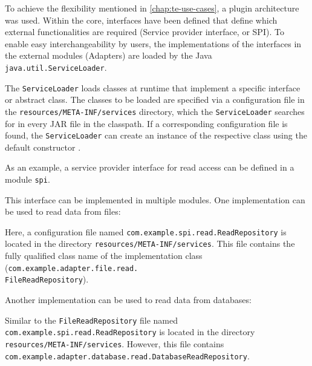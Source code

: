 To achieve the flexibility mentioned in \autoref{chap:te-use-cases}, a plugin architecture was used.
Within the core, interfaces have been defined that define which external functionalities are required (Service provider interface, or SPI).
To enable easy interchangeability by users, the implementations of the interfaces in the external modules (Adapters) are loaded by the Java \texttt{java.util.ServiceLoader}.

The \texttt{ServiceLoader} loads classes at runtime that implement a specific interface or abstract class.
The classes to be loaded are specified via a configuration file in the \texttt{resources/META-INF/services} directory, which the \texttt{ServiceLoader} searches for in every JAR file in the classpath.
If a corresponding configuration file is found, the \texttt{ServiceLoader} can create an instance of the respective class using the default constructor \cite{java-service-loader}.

As an example, a service provider interface for read access can be defined in a module \texttt{spi}.



\noindent
This interface can be implemented in multiple modules.
One implementation can be used to read data from files:



\noindent
Here, a configuration file named \texttt{com.example.spi.read.ReadRepository} is located in the directory \texttt{resources/META-INF/services}.
This file contains the fully qualified class name of the implementation class (\texttt{com.example.adapter.file.read.}\\\texttt{FileReadRepository}).

Another implementation can be used to read data from databases:



\noindent
Similar to the \texttt{FileReadRepository} file named \texttt{com.example.spi.read.ReadRepository} is located in the directory \texttt{resources/META-INF/services}.
However, this file contains \texttt{com.example.adapter.database.read.DatabaseReadRepository}.

